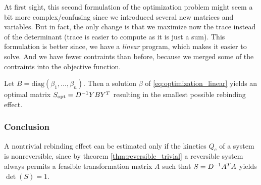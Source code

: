 At first sight, this second formulation of the optimization problem might seem a bit more complex/confusing since we introduced several new matrices and variables.
But in fact, the only change is that we maximize now the trace instead of the determinant (trace is easier to compute as it is just a sum).
This formulation is better since, we have a \textit{linear} program, which makes it easier to solve. And we have fewer contraints than before, because we merged some of the contraints into the objective function.

Let $B = \mathrm{diag}(\beta_1,\dots, \beta_n)$. Then a solution $\beta$ of \eqref{eq:optimization_linear} yields an optimal matrix $S_{\mathrm{opt}} = D^{-1} YBY^T$ resulting in the smallest possible rebinding effect.



\subsubsection*{Conclusion}

A nontrivial rebinding effect can be estimated only if the kinetics $Q_c$ of a system is nonreversible, since by theorem \ref{thm:reversible_trivial} a reversible system always permits a feasible transformation matrix $A$ such that $S=D^{-1} A^TA$ yields $\det(S)=1$. %
\newpage